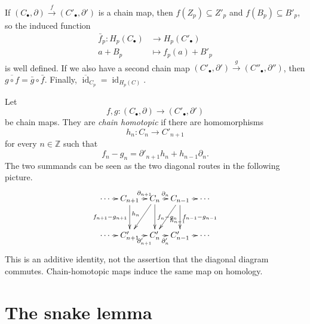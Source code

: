 \begin{exercise}
If $(C_\bullet,\partial)\xrightarrow
f(C'_\bullet,\partial')$
is a chain map, then $f(Z_p)\subseteq
Z'_p$ and
$f(B_p)\subseteq B'_p$, so the induced
function
$$
\begin{aligned}
\bar f_p:H_p(C_\bullet)&\to H_p(C'_\bullet)\\
a+B_p&\mapsto f_p(a)+B'_p
\end{aligned}
$$
is well defined. If we also have a second
chain map
$(C'_\bullet,\partial')\xrightarrow
g(C''_\bullet,\partial'')$,
then $\overline{g\circ f}=\bar g\circ\bar f$.
Finally,
$\overline{\operatorname{id}}_{C_p}
=\operatorname{id}_{H_p(C)}$.
\end{exercise}

\begin{definition}
\label{at-definition-chain-homotopy}
Let
$$
f,g:(C_\bullet,\partial)
\longrightarrow
(C'_\bullet,\partial')
$$
be chain maps.  They are {\it chain
homotopic} if there are homomorphisms
$$
h_n:C_n\longrightarrow C'_{n+1}
$$
for every $n\in\mathbb{Z}$ such that
$$
f_n-g_n
=
\partial'_{n+1}h_n
+h_{n-1}\partial_n.
$$
The two summands can be seen as the two
diagonal routes in the following picture.
$$
\xymatrix@C=.65em@R=2.8em{
\cdots \ar[r]
  & C_{n+1}
    \ar[r]^-{\partial_{n+1}}
    \ar[d]_{f_{n+1}-g_{n+1}}
  & C_n
    \ar[r]^-{\partial_n}
    \ar[d]^{f_n-g_n}
    \ar[dl]_{h_n}
  & C_{n-1}
    \ar[r]
    \ar[d]^{f_{n-1}-g_{n-1}}
    \ar[dl]^{h_{n-1}}
  & \cdots \\
\cdots \ar[r]
  & C'_{n+1}
    \ar[r]_-{\partial'_{n+1}}
  & C'_n
    \ar[r]_-{\partial'_n}
  & C'_{n-1}
    \ar[r]
  & \cdots
}
$$
This is an additive identity, not the
assertion that the diagonal diagram
commutes.  Chain-homotopic maps induce the
same map on homology.
\end{definition}

\section{The snake lemma}
\label{section-snake-lemma}

